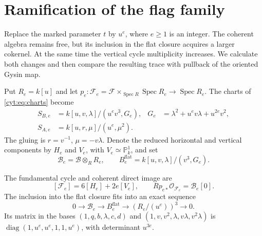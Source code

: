 \section{Ramification of the flag family}
\label{cyr:section}

Replace the marked parameter \(t\) by \(u^e\), where
\(e\geq1\) is an integer. The coherent algebra remains free,
but its inclusion in the flat closure acquires a larger
cokernel. At the same time the vertical cycle multiplicity
increases. We calculate both changes and then compare the
resulting trace with pullback of the oriented Gysin map.

Put \(R_e=k[u]\) and let
\(p_e:\mathscr F_e=\mathscr F\times_{\operatorname{Spec}R}
\operatorname{Spec}R_e\to\operatorname{Spec}R_e\).
The charts of \eqref{cyt:eq:charts} become
\begin{equation}\label{cyr:eq:charts}
 \begin{aligned}
 S_{B,e}&=k[u,v,\lambda]/(u^ev^3,G_e),&
 G_e&=\lambda^2+u^ev\lambda+u^{2e}v^2,\\
 S_{A,e}&=k[u,r,\mu]/(u^e,\mu^2).
 \end{aligned}
\end{equation}
The gluing is \(r=v^{-1}\), \(\mu=-v\lambda\).
Denote the reduced horizontal and vertical components by
\(H_e\) and \(V_e\), with \(V_e\simeq\mathbb P^1_k\), and set
\[
 \mathcal B_e=\mathcal B\otimes_RR_e,\qquad
 B_e^{\mathrm{flat}}=k[u,v,\lambda]/(v^3,G_e).
\]

\begin{proposition}\label{cyr:prop:coherent}
The fundamental cycle and coherent direct image are
\begin{equation}\label{cyr:eq:cycle}
 [\mathscr F_e]=6[H_e]+2e[V_e],\qquad
 Rp_{e*}\mathcal O_{\mathscr F_e}=\mathcal B_e[0].
\end{equation}
The inclusion into the flat closure fits into an exact sequence
\begin{equation}\label{cyr:eq:lattice}
 0\longrightarrow\mathcal B_e\longrightarrow B_e^{\mathrm{flat}}
 \longrightarrow(R_e/(u^e))^3\longrightarrow0.
\end{equation}
Its matrix in the bases
\((1,q,b,\lambda,c,d)\) and
\((1,v,v^2,\lambda,v\lambda,v^2\lambda)\) is
\(\operatorname{diag}(1,u^e,u^e,1,1,u^e)\), with determinant
\(u^{3e}\).
\end{proposition}


